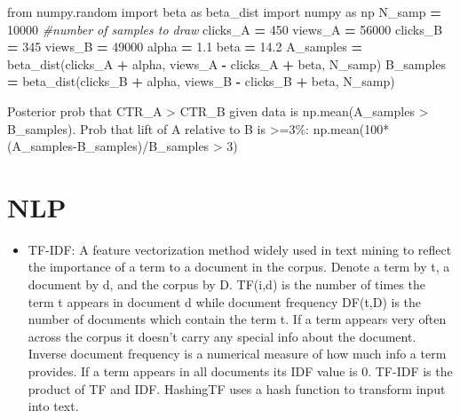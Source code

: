 \documentclass[]{book}
\newenvironment{Shaded}{\begin{snugshade}}{\end{snugshade}}
\newcommand{\DecValTok}[1]{\textcolor[rgb]{0.00,0.00,0.81}{#1}}
\newcommand{\FloatTok}[1]{\textcolor[rgb]{0.00,0.00,0.81}{#1}}
\newcommand{\ImportTok}[1]{#1}
\newcommand{\CommentTok}[1]{\textcolor[rgb]{0.56,0.35,0.01}{\textit{#1}}}
\newcommand{\OperatorTok}[1]{\textcolor[rgb]{0.81,0.36,0.00}{\textbf{#1}}}
\newcommand{\NormalTok}[1]{#1}
\providecommand{\tightlist}{%
  \setlength{\itemsep}{0pt}\setlength{\parskip}{0pt}}
\theoremstyle{definition}
\theoremstyle{definition}
\theoremstyle{definition}
\theoremstyle{remark}
\begin{document}
\begin{Shaded}
\begin{Highlighting}[]
\ImportTok{from}\NormalTok{ numpy.random }\ImportTok{import}\NormalTok{ beta }\ImportTok{as}\NormalTok{ beta_dist}
\ImportTok{import}\NormalTok{ numpy }\ImportTok{as}\NormalTok{ np}
\NormalTok{N_samp }\OperatorTok{=} \DecValTok{10000} \CommentTok{#number of samples to draw}
\NormalTok{clicks_A }\OperatorTok{=} \DecValTok{450}
\NormalTok{views_A }\OperatorTok{=} \DecValTok{56000}
\NormalTok{clicks_B }\OperatorTok{=} \DecValTok{345}
\NormalTok{views_B }\OperatorTok{=} \DecValTok{49000}
\NormalTok{alpha }\OperatorTok{=} \FloatTok{1.1}
\NormalTok{beta }\OperatorTok{=} \FloatTok{14.2}
\NormalTok{A_samples }\OperatorTok{=}\NormalTok{ beta_dist(clicks_A }\OperatorTok{+}\NormalTok{ alpha, views_A }\OperatorTok{-}\NormalTok{ clicks_A }\OperatorTok{+}\NormalTok{ beta, N_samp)}
\NormalTok{B_samples }\OperatorTok{=}\NormalTok{ beta_dist(clicks_B }\OperatorTok{+}\NormalTok{ alpha, views_B }\OperatorTok{-}\NormalTok{ clicks_B }\OperatorTok{+}\NormalTok{ beta, N_samp)}
\end{Highlighting}
\end{Shaded}

Posterior prob that CTR\_A \textgreater{} CTR\_B given data is
np.mean(A\_samples \textgreater{} B\_samples). Prob that lift of A
relative to B is \textgreater{}=3\%:
np.mean(100*(A\_samples-B\_samples)/B\_samples \textgreater{} 3)

\chapter{NLP}\label{nlp}

\begin{itemize}
\tightlist
\item
  TF-IDF: A feature vectorization method widely used in text mining to
  reflect the importance of a term to a document in the corpus. Denote a
  term by t, a document by d, and the corpus by D. TF(i,d) is the number
  of times the term t appears in document d while document frequency
  DF(t,D) is the number of documents which contain the term t. If a term
  appears very often across the corpus it doesn't carry any special info
  about the document. Inverse document frequency is a numerical measure
  of how much info a term provides. If a term appears in all documents
  its IDF value is 0. TF-IDF is the product of TF and IDF. HashingTF
  uses a hash function to transform input into text.
\end{itemize}
\end{document}
